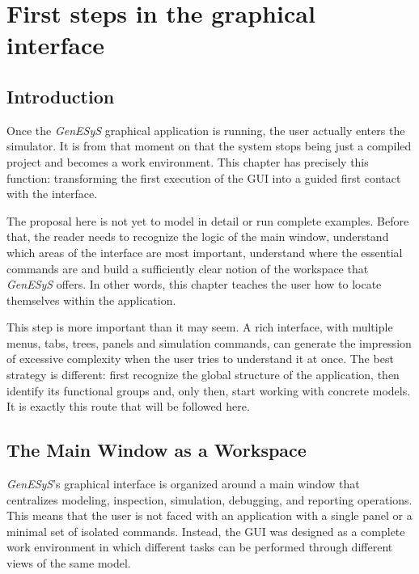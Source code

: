 \chapter{First steps in the graphical interface}
\label{chap:primeiros_passos_interface_grafica}

\section{Introduction}
\label{sec:cap3_introducao}

Once the \textit{GenESyS} graphical application is running, the user actually enters the simulator. It is from that moment on that the system stops being just a compiled project and becomes a work environment. This chapter has precisely this function: transforming the first execution of the GUI into a guided first contact with the interface.

The proposal here is not yet to model in detail or run complete examples. Before that, the reader needs to recognize the logic of the main window, understand which areas of the interface are most important, understand where the essential commands are and build a sufficiently clear notion of the workspace that \textit{GenESyS} offers. In other words, this chapter teaches the user how to locate themselves within the application.

This step is more important than it may seem. A rich interface, with multiple menus, tabs, trees, panels and simulation commands, can generate the impression of excessive complexity when the user tries to understand it at once. The best strategy is different: first recognize the global structure of the application, then identify its functional groups and, only then, start working with concrete models. It is exactly this route that will be followed here.

\section{The Main Window as a Workspace}
\label{sec:cap3_janela_principal_ambiente}

\textit{GenESyS}'s graphical interface is organized around a main window that centralizes modeling, inspection, simulation, debugging, and reporting operations. This means that the user is not faced with an application with a single panel or a minimal set of isolated commands. Instead, the GUI was designed as a complete work environment in which different tasks can be performed through different views of the same model.

